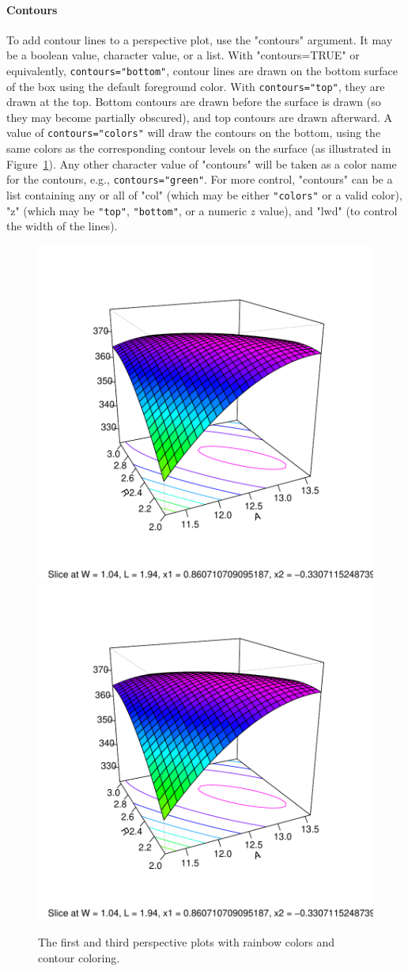 \documentclass[article,nojss]{jss}
\begin{document}
\paragraph{Contours}
To add contour lines to a perspective plot, use the "contours" argument.  It may be a boolean value, character value, or a list.  With "contours=TRUE" or equivalently, \verb|contours="bottom"|, contour lines are drawn on the bottom surface of the box using the default foreground color.  With \verb|contours="top"|, they are drawn at the top.  Bottom contours are drawn before the surface is drawn (so they may become partially obscured), and top contours are drawn afterward.
A value of \verb|contours="colors"| will draw the contours on the bottom, using the same colors as the corresponding contour levels on the surface (as illustrated in Figure~\ref{persp}).  Any other character value of "contours" will be taken as a color name for the contours, e.g., \verb|contours="green"|.  For more control, "contours" can be a list containing any or all of "col" (which may be either \verb|"colors"| or a valid color), "z" (which may be \verb|"top"|, \verb|"bottom"|, or a numeric $z$ value), and "lwd" (to control the width of the lines).

\begin{figure}
\includegraphics[width=.5\linewidth,page=2]{rsm-plots-persp.pdf}%
\includegraphics[width=.5\linewidth,page=3]{rsm-plots-persp.pdf}
\caption{The first and third perspective plots with rainbow colors and contour coloring.}\label{persp}
\end{figure}
\end{document}
